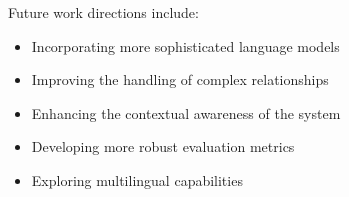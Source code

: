 \documentclass[3p,times,procedia]{elsarticle}
\begin{document}
Future work directions include:
\begin{itemize}
    \item Incorporating more sophisticated language models
    \item Improving the handling of complex relationships
    \item Enhancing the contextual awareness of the system
    \item Developing more robust evaluation metrics
    \item Exploring multilingual capabilities
\end{itemize}



\end{document}
